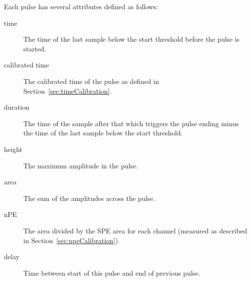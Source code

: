 \documentclass[12pt]{article}
\begin{document}
Each pulse has several attributes defined as follows:

\begin{description}
    \item[time] The time of the last sample below the start threshold before the pulse is started.
    \item[calibrated time] The calibrated time of the pulse as defined in Section~\ref{sec:timeCalibration}.
    \item[duration] The time of the sample after that which triggers the pulse ending minus the time of the last sample below the start threshold.
    \item[height] The maximum amplitude in the pulse.
    \item[area] The sum of the amplitudes across the pulse.
    \item[nPE] The area divided by the SPE area for each channel (measured as described in Section~\ref{sec:npeCalibration}).
    \item[delay] Time between start of this pulse and end of previous pulse.
\end{description}
\end{document}
